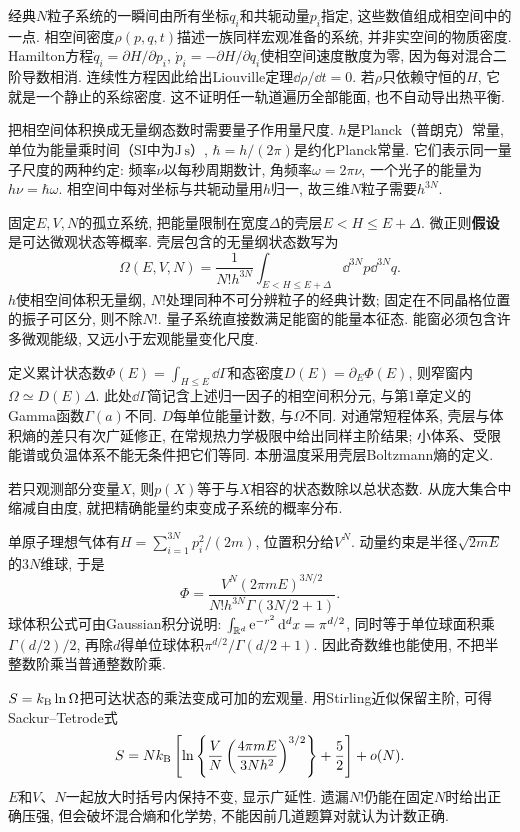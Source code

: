 \label{ch:micro}
经典$N$粒子系统的一瞬间由所有坐标$q_i$和共轭动量$p_i$指定, 这些数值组成相空间中的一点. 相空间密度$\rho(p,q,t)$描述一族同样宏观准备的系统, 并非实空间的物质密度. Hamilton方程$\dot q_i=\partial H/\partial p_i$, $\dot p_i=-\partial H/\partial q_i$使相空间速度散度为零, 因为每对混合二阶导数相消. 连续性方程因此给出Liouville定理$\dd\rho/\dd t=0$. 若$\rho$只依赖守恒的$H$, 它就是一个静止的系综密度. 这不证明任一轨道遍历全部能面, 也不自动导出热平衡.

把相空间体积换成无量纲态数时需要量子作用量尺度. $h$是Planck（普朗克）常量, 单位为能量乘时间（SI中为$\mathrm{J\,s}$）, $\hbar=h/(2\pi)$是约化Planck常量. 它们表示同一量子尺度的两种约定: 频率$\nu$以每秒周期数计, 角频率$\omega=2\pi\nu$, 一个光子的能量为$h\nu=\hbar\omega$. 相空间中每对坐标与共轭动量用$h$归一, 故三维$N$粒子需要$h^{3N}$.

固定$E,V,N$的孤立系统, 把能量限制在宽度$\Delta$的壳层$E<H\le E+\Delta$. 微正则\textbf{假设}是可达微观状态等概率. 壳层包含的无量纲状态数写为
\[
\Omega(E,V,N)=\frac1{N!h^{3N}}\int_{E<H\le E+\Delta}\dd^{3N}p\dd^{3N}q.
\]
$h$使相空间体积无量纲, $N!$处理同种不可分辨粒子的经典计数; 固定在不同晶格位置的振子可区分, 则不除$N!$. 量子系统直接数满足能窗的能量本征态. 能窗必须包含许多微观能级, 又远小于宏观能量变化尺度.

定义累计状态数$\Phi(E)=\int_{H\le E}\dd\Gamma$和态密度$D(E)=\partial_E\Phi(E)$, 则窄窗内$\Omega\simeq D(E)\Delta$. 此处$\dd\Gamma$简记含上述归一因子的相空间积分元, 与第1章定义的Gamma函数$\Gamma(a)$不同. $D$每单位能量计数, 与$\Omega$不同. 对通常短程体系, 壳层与体积熵的差只有次广延修正, 在常规热力学极限中给出同样主阶结果; 小体系、受限能谱或负温体系不能无条件把它们等同. 本册温度采用壳层Boltzmann熵的定义.

若只观测部分变量$X$, 则$p(X)$等于与$X$相容的状态数除以总状态数. 从庞大集合中缩减自由度, 就把精确能量约束变成子系统的概率分布.

单原子理想气体有$H=\sum_{i=1}^{3N}p_i^2/(2m)$, 位置积分给$V^N$. 动量约束是半径$\sqrt{2mE}$的$3N$维球, 于是
\[
\Phi=\frac{V^N(2\pi mE)^{3N/2}}{N!h^{3N}\Gamma(3N/2+1)}.
\]
球体积公式可由Gaussian积分说明: $\int_{\mathbb R^d}\mathrm e^{-r^2}\,\mathrm d^dx=\pi^{d/2}$, 同时等于单位球面积乘$\Gamma(d/2)/2$, 再除$d$得单位球体积$\pi^{d/2}/\Gamma(d/2+1)$. 因此奇数维也能使用, 不把半整数阶乘当普通整数阶乘.

$S=k_{\mathrm B}\ln\Omega$把可达状态的乘法变成可加的宏观量. 用Stirling近似保留主阶, 可得Sackur--Tetrode式
\[
S=Nk_{\mathrm B}\left[\ln\left\{\frac VN\left(\frac{4\pi mE}{3Nh^2}\right)^{3/2}\right\}+\frac52\right]+o(N).
\]
$E$和$V$、$N$一起放大时括号内保持不变, 显示广延性. 遗漏$N!$仍能在固定$N$时给出正确压强, 但会破坏混合熵和化学势, 不能因前几道题算对就认为计数正确.

